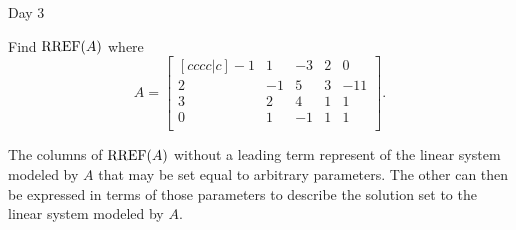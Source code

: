 \begin{applicationActivities}{Day 3}
\begin{activity}{15}
  Find \(\operatorname{RREF}(A)\) where
  \[A=
    \begin{bmatrix}[cccc|c]
      -1 &  1 & -3 &  2 &  0 \\
       2 & -1 &  5 &  3 & -11 \\
       3 &  2 &  4 &  1 &  1 \\
       0 &  1 & -1 &  1 &  1 \\
    \end{bmatrix}
  .\]
\end{activity}

\begin{definition}
  The columns of \(\operatorname{RREF}(A)\) without a leading term represent
   of the linear system modeled by \(A\)
  that may be set equal to arbitrary parameters.
  The other  can then be expressed in terms
  of those parameters to describe the solution set
  to the linear system modeled by \(A\).
\end{definition}


\end{applicationActivities}

